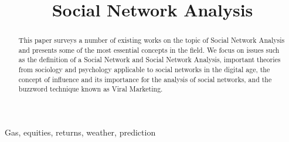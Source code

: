 \documentclass[conference,letterpaper]{IEEEtran}
\begin{document}
\title{\huge Social Network Analysis}

\author{
}

\maketitle
\begin{abstract}
This paper surveys a number of existing works on the topic of Social Network Analysis and presents some of the most essential concepts in the field. We focus on issues such as the definition of a Social Network and Social Network Analysis, important theories from sociology and psychology applicable to social networks in the digital age, the concept of influence and its importance for the analysis of social networks, and the buzzword technique known as Viral Marketing.
\\
\end{abstract}

\begin{keywords}
Gas, equities, returns, weather, prediction
\end{keywords}
\end{document}
